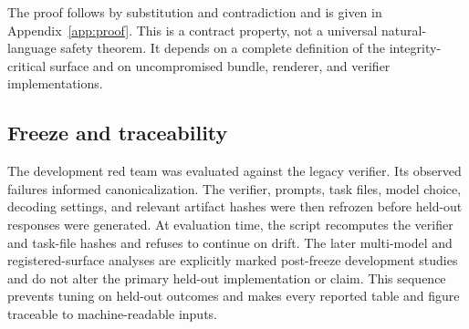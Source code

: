 \noindent The proof follows by substitution and contradiction and is given in Appendix~\ref{app:proof}. This is a contract property, not a universal natural-language safety theorem. It depends on a complete definition of the integrity-critical surface and on uncompromised bundle, renderer, and verifier implementations.

\subsection{Freeze and traceability}

The development red team was evaluated against the legacy verifier. Its observed failures informed canonicalization. The verifier, prompts, task files, model choice, decoding settings, and relevant artifact hashes were then refrozen before held-out responses were generated. At evaluation time, the script recomputes the verifier and task-file hashes and refuses to continue on drift. The later multi-model and registered-surface analyses are explicitly marked post-freeze development studies and do not alter the primary held-out implementation or claim. This sequence prevents tuning on held-out outcomes and makes every reported table and figure traceable to machine-readable inputs.


